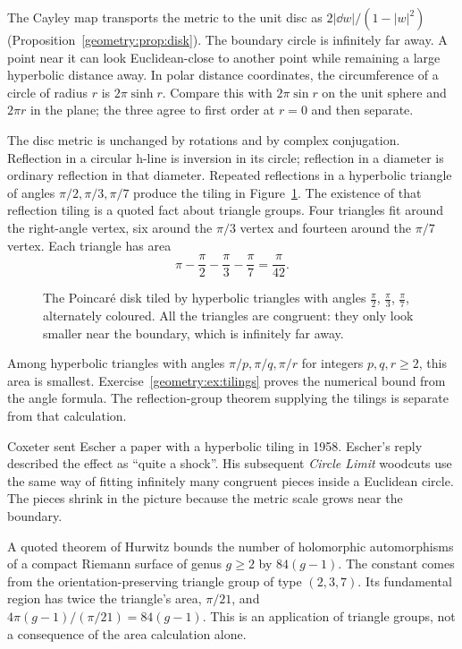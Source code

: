 The Cayley map transports the metric to the unit disc as
$2|\dd w|/(1-|w|^2)$ (Proposition~\ref{geometry:prop:disk}).
The boundary circle is infinitely far away. A point near it can look
Euclidean-close to another point while remaining a large hyperbolic
distance away. In polar distance coordinates, the circumference of a
circle of radius $r$ is $2\pi\sinh r$. Compare this with $2\pi\sin r$
on the unit sphere and $2\pi r$ in the plane; the three agree to first
order at $r=0$ and then separate.

The disc metric is unchanged by rotations and by complex conjugation.
Reflection in a circular h-line is inversion in its circle; reflection
in a diameter is ordinary reflection in that diameter.
Repeated reflections in a hyperbolic triangle of angles
$\pi/2,\pi/3,\pi/7$ produce the tiling in
Figure~\ref{geometry:fig:tiling}. The existence of that reflection tiling
is a quoted fact about triangle groups. Four triangles fit around the
right-angle vertex, six around the $\pi/3$ vertex and fourteen around
the $\pi/7$ vertex. Each triangle has area
\[
 \pi-\frac\pi2-\frac\pi3-\frac\pi7=\frac\pi{42}.
\]

\begin{figure}[ht]
\centering
{}
\caption{The Poincar\'e disk tiled by hyperbolic triangles with angles $\frac\pi2$, $\frac\pi3$, $\frac\pi7$, alternately coloured. All the triangles are
congruent: they only look smaller near the boundary, which is infinitely far away.}
\label{geometry:fig:tiling}
\end{figure}

Among hyperbolic triangles with angles $\pi/p,\pi/q,\pi/r$ for integers
$p,q,r\ge2$, this area is smallest. Exercise~\ref{geometry:ex:tilings}
proves the numerical bound from the angle formula. The reflection-group
theorem supplying the tilings is separate from that calculation.

Coxeter sent Escher a paper with a hyperbolic tiling in 1958. Escher's
reply described the effect as ``quite a shock''. His subsequent
\emph{Circle Limit} woodcuts use the same way of fitting infinitely many
congruent pieces inside a Euclidean circle. The pieces shrink in the
picture because the metric scale grows near the boundary.

\begin{remark}
A quoted theorem of Hurwitz bounds the number of holomorphic automorphisms
of a compact Riemann surface of genus $g\ge2$ by $84(g-1)$.
The constant comes from the orientation-preserving triangle group of type
$(2,3,7)$. Its fundamental region has twice the triangle's area,
$\pi/21$, and $4\pi(g-1)/(\pi/21)=84(g-1)$.
This is an application of triangle groups, not a consequence of the area
calculation alone.
\end{remark}


